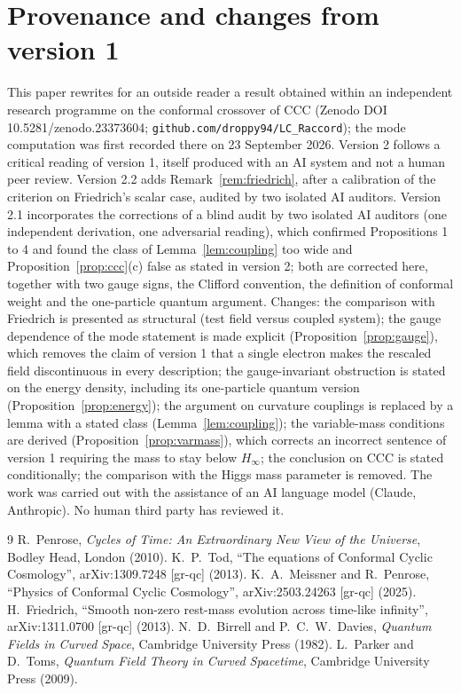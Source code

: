\documentclass[11pt,a4paper]{article}
\theoremstyle{definition}
\begin{document}
\section*{Provenance and changes from version 1}
This paper rewrites for an outside reader a result obtained within an independent research programme on the conformal crossover of CCC (Zenodo DOI 10.5281/zenodo.23373604; \texttt{github.com/droppy94/LC\_Raccord}); the mode computation was first recorded there on 23 September 2026. Version 2 follows a critical reading of version 1, itself produced with an AI system and not a human peer review. Version 2.2 adds Remark~\ref{rem:friedrich}, after a calibration of the criterion on Friedrich's scalar case, audited by two isolated AI auditors. Version 2.1 incorporates the corrections of a blind audit by two isolated AI auditors (one independent derivation, one adversarial reading), which confirmed Propositions 1 to 4 and found the class of Lemma~\ref{lem:coupling} too wide and Proposition~\ref{prop:ccc}(c) false as stated in version 2; both are corrected here, together with two gauge signs, the Clifford convention, the definition of conformal weight and the one-particle quantum argument. Changes: the comparison with Friedrich is presented as structural (test field versus coupled system); the gauge dependence of the mode statement is made explicit (Proposition~\ref{prop:gauge}), which removes the claim of version 1 that a single electron makes the rescaled field discontinuous in every description; the gauge-invariant obstruction is stated on the energy density, including its one-particle quantum version (Proposition~\ref{prop:energy}); the argument on curvature couplings is replaced by a lemma with a stated class (Lemma~\ref{lem:coupling}); the variable-mass conditions are derived (Proposition~\ref{prop:varmass}), which corrects an incorrect sentence of version 1 requiring the mass to stay below $H_{\infty}$; the conclusion on CCC is stated conditionally; the comparison with the Higgs mass parameter is removed. The work was carried out with the assistance of an AI language model (Claude, Anthropic). No human third party has reviewed it.

\begin{thebibliography}{9}
 R.~Penrose, \emph{Cycles of Time: An Extraordinary New View of the Universe}, Bodley Head, London (2010).
 K.~P.~Tod, ``The equations of Conformal Cyclic Cosmology'', arXiv:1309.7248 [gr-qc] (2013).
 K.~A.~Meissner and R.~Penrose, ``Physics of Conformal Cyclic Cosmology'', arXiv:2503.24263 [gr-qc] (2025).
 H.~Friedrich, ``Smooth non-zero rest-mass evolution across time-like infinity'', arXiv:1311.0700 [gr-qc] (2013).
 N.~D.~Birrell and P.~C.~W.~Davies, \emph{Quantum Fields in Curved Space}, Cambridge University Press (1982).
 L.~Parker and D.~Toms, \emph{Quantum Field Theory in Curved Spacetime}, Cambridge University Press (2009).
\end{thebibliography}
\end{document}
